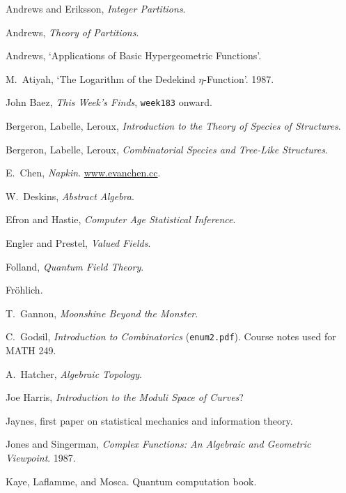 \begin{thebibliography}{}

Andrews and Eriksson, \emph{Integer Partitions}.

Andrews, \emph{Theory of Partitions}.

Andrews, `Applications of Basic Hypergeometric Functions'.

M.\ Atiyah, `The Logarithm of the Dedekind $\eta$-Function'. 1987.

John Baez, \emph{This Week's Finds}, \texttt{week183} onward.

Bergeron, Labelle, Leroux, \emph{Introduction to the Theory of Species of Structures}.

Bergeron, Labelle, Leroux, \emph{Combinatorial Species and Tree-Like Structures}. 

E.\ Chen, \emph{Napkin}. \url{www.evanchen.cc}.

W.\ Deskins, \emph{Abstract Algebra}.

Efron and Hastie, \emph{Computer Age Statistical Inference}.

Engler and Prestel, \emph{Valued Fields}.

Folland, \emph{Quantum Field Theory}.

Fr\"ohlich.

T.\ Gannon, \emph{Moonshine Beyond the Monster}.

C.\ Godsil, \emph{Introduction to Combinatorics} (\texttt{enum2.pdf}). Course notes used for MATH 249.

A.\ Hatcher, \emph{Algebraic Topology}.

Joe Harris, \emph{Introduction to the Moduli Space of Curves}?

Jaynes, first paper on statistical mechanics and information theory.

Jones and Singerman, \emph{Complex Functions: An Algebraic and Geometric Viewpoint}. 1987.

Kaye, Laflamme, and Mosca. Quantum computation book.


\end{thebibliography}
